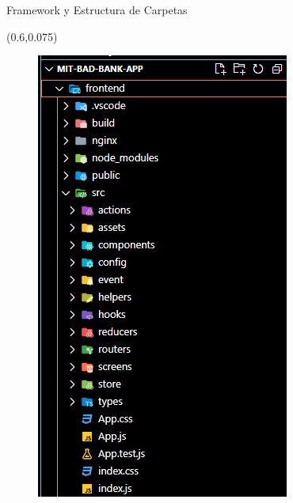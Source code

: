 \documentclass[xcolor=pdftex,dvipsnames,table]{beamer}
\begin{document}
\begin{frame}{Framework y Estructura de Carpetas}
{    
    \begin{textblock*}{0.5\textwidth}(0.6\textwidth,0.075\textwidth)
        \begin{figure}
            \centering
            \includegraphics[width=0.75\linewidth]{front/sc2.png}
            \label{fig:my_label}
        \end{figure}
    \end{textblock*}}
\end{frame}
\end{document}
